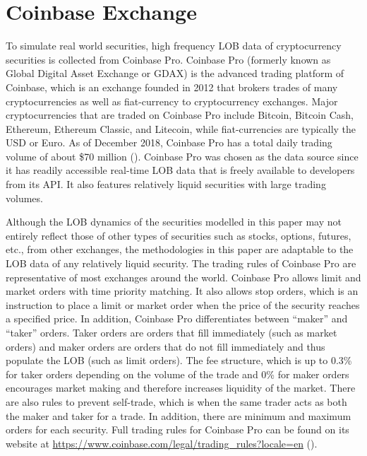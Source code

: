 \section{Coinbase Exchange}

To simulate real world securities, high frequency LOB data of cryptocurrency securities is collected from Coinbase Pro. Coinbase Pro (formerly known as Global Digital Asset Exchange or GDAX) is the advanced trading platform of Coinbase, which is an exchange founded in 2012 that brokers trades of many cryptocurrencies as well as fiat-currency to cryptocurrency exchanges. Major cryptocurrencies that are traded on Coinbase Pro include Bitcoin, Bitcoin Cash, Ethereum, Ethereum Classic, and Litecoin, while fiat-currencies are typically the USD or Euro. As of December 2018, Coinbase Pro has a total daily trading volume of about \$70 million (\cite{L1}). Coinbase Pro was chosen as the data source since it has readily accessible real-time LOB data that is freely available to developers from its API. It also features relatively liquid securities with large trading volumes. 

Although the LOB dynamics of the securities modelled in this paper may not entirely reflect those of other types of securities such as stocks, options, futures, etc., from other exchanges, the methodologies in this paper are adaptable to the LOB data of any relatively liquid security. The trading rules of Coinbase Pro are representative of most exchanges around the world. Coinbase Pro allows limit and market orders with time priority matching. It also allows stop orders, which is an instruction to place a limit or market order when the price of the security reaches a specified price. In addition, Coinbase Pro differentiates between “maker” and “taker” orders. Taker orders are orders that fill immediately (such as market orders) and maker orders are orders that do not fill immediately and thus populate the LOB (such as limit orders). The fee structure, which is up to 0.3\% for taker orders depending on the volume of the trade and 0\% for maker orders encourages market making and therefore increases liquidity of the market. There are also rules to prevent self-trade, which is when the same trader acts as both the maker and taker for a trade. In addition, there are minimum and maximum orders for each security. Full trading rules for Coinbase Pro can be found on its website at \url{https://www.coinbase.com/legal/trading_rules?locale=en} (\cite{L2}).

